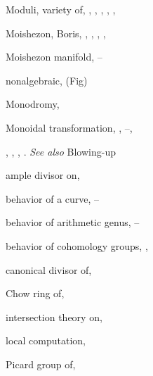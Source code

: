 {{\noindent\hspace*{0.0bp}Moduli, variety of, , , , , , \par
\noindent\hspace*{0.0bp}Moishezon, Boris, , , , , \par
\noindent\hspace*{0.0bp}Moishezon manifold, --\par
\noindent\hspace*{7.5bp}nonalgebraic,  (Fig)\par
\noindent\hspace*{0.0bp}Monodromy, \par
\noindent\hspace*{0.0bp}Monoidal transformation, , --,\par
\noindent\hspace*{15.0bp}, , , . \emph{See also} Blowing-up\par
\noindent\hspace*{7.5bp}ample divisor on, \par
\noindent\hspace*{7.5bp}behavior of a curve, --\par
\noindent\hspace*{7.5bp}behavior of arithmetic genus, --\par
\noindent\hspace*{7.5bp}behavior of cohomology groups, , \par
\noindent\hspace*{7.5bp}canonical divisor of, \par
\noindent\hspace*{7.5bp}Chow ring of, \par
\noindent\hspace*{7.5bp}intersection theory on, \par
\noindent\hspace*{7.5bp}local computation, \par
\noindent\hspace*{7.5bp}Picard group of, \par
}}
